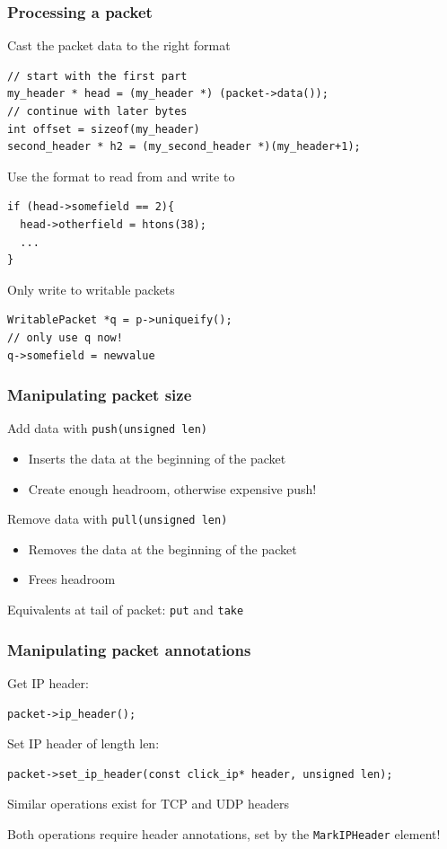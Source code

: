 \documentclass{beamer}
\begin{document}
\begin{frame}
\frametitle{Processing a packet}
Cast the packet data to the right format
\begin{lstlisting}[basicstyle=\footnotesize]
// start with the first part
my_header * head = (my_header *) (packet->data());
// continue with later bytes
int offset = sizeof(my_header)
second_header * h2 = (my_second_header *)(my_header+1);
\end{lstlisting}
Use the format to read from and write to
\begin{lstlisting}[basicstyle=\footnotesize]
if (head->somefield == 2){
  head->otherfield = htons(38);
  ...
}
\end{lstlisting}
\framebreak
Only write to writable packets
\begin{lstlisting}[basicstyle=\footnotesize]
WritablePacket *q = p->uniqueify();
// only use q now!
q->somefield = newvalue
\end{lstlisting}
\end{frame}

\begin{frame}[fragile]
\frametitle{Manipulating packet size}
Add data with \lstinline!push(unsigned len)!
\begin{itemize}
	\item Inserts the data at the beginning of the packet
	\item Create enough headroom, otherwise expensive push!
\end{itemize}
Remove data with \lstinline!pull(unsigned len)!
\begin{itemize}
	\item Removes the data at the beginning of the packet
	\item Frees headroom
\end{itemize}
Equivalents at tail of packet: \lstinline!put! and \lstinline!take!
\end{frame}

\begin{frame}[fragile]
\frametitle{Manipulating packet annotations}
Get IP header:
\begin{lstlisting}[basicstyle=\footnotesize]
packet->ip_header();
\end{lstlisting}
Set IP header of length len:
\begin{lstlisting}[basicstyle=\footnotesize]
packet->set_ip_header(const click_ip* header, unsigned len);
\end{lstlisting}
Similar operations exist for TCP and UDP headers

Both operations require header annotations, set by the \lstinline!MarkIPHeader! element!
\end{frame}
\end{document}
